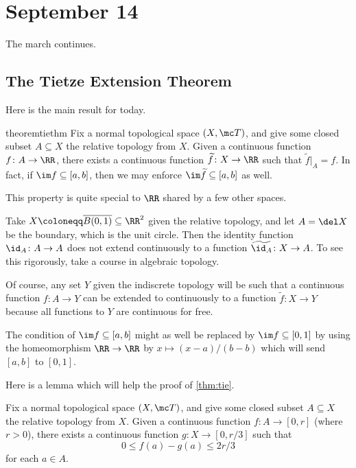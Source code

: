 \documentclass[../notes.tex]{subfiles}
\begin{document}
\section{September 14}

The march continues.

\subsection{The Tietze Extension Theorem}
Here is the main result for today.
\begin{restatable}{theorem}{tiethm} \label{thm:tie}
	Fix a normal topological space $(X,\mc T)$, and give some closed subset $A\subseteq X$ the relative topology from $X$. Given a continuous function $f\colon A\to\RR$, there exists a continuous function $\widetilde f\colon X\to\RR$ such that $\widetilde f|_A=f$. In fact, if $\im f\subseteq[a,b]$, then we may enforce $\im\widetilde f\subseteq[a,b]$ as well.
\end{restatable}
This property is quite special to $\RR$ shared by a few other spaces.
\begin{example}
	Take $X\coloneqq\overline{B(0,1)}\subseteq\RR^2$ given the relative topology, and let $A=\del X$ be the boundary, which is the unit circle. Then the identity function $\id_A\colon A\to A$ does not extend continuously to a function $\widetilde{\id_A}\colon X\to A$. To see this rigorously, take a course in algebraic topology.
\end{example}
\begin{example}
	Of course, any set $Y$ given the indiscrete topology will be such that a continuous function $f\colon A\to Y$ can be extended to continuously to a function $\widetilde f\colon X\to Y$ because all functions to $Y$ are continuous for free.
\end{example}
\begin{remark}
	The condition of $\im f\subseteq[a,b]$ might as well be replaced by $\im f\subseteq[0,1]$ by using the homeomorphism $\RR\to\RR$ by $x\mapsto(x-a)/(b-b)$ which will send $[a,b]$ to $[0,1]$.
\end{remark}
Here is a lemma which will help the proof of \autoref{thm:tie}.
\begin{lemma} \label{lem:techtie}
	Fix a normal topological space $(X,\mc T)$, and give some closed subset $A\subseteq X$ the relative topology from $X$. Given a continuous function $f\colon A\to[0,r]$ (where $r>0$), there exists a continuous function $g\colon X\to[0,r/3]$ such that
	\[0\le f(a)-g(a)\le2r/3\]
	for each $a\in A$.
\end{lemma}
\end{document}

